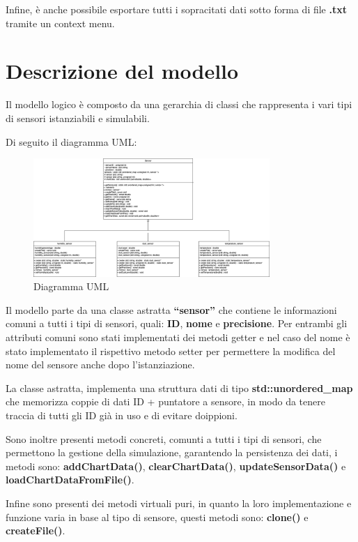 \documentclass{article}
\begin{document}
    Infine, è anche possibile esportare tutti i sopracitati dati sotto forma di file \textbf{.txt} tramite un context menu.

    \section{Descrizione del modello}
    Il modello logico è composto da una gerarchia di classi che rappresenta i vari tipi di sensori istanziabili e simulabili. 
        
    Di seguito il diagramma UML:    
    \begin{figure}[h!]
        \centering
        \includegraphics[width=0.8\textwidth]{UML.png}
        \caption*{Diagramma UML}
    \end{figure}

    \newpage
    \noindent Il modello parte da una classe astratta \textbf{“sensor”} che contiene le informazioni comuni a tutti i tipi di sensori, quali: \textbf{ID}, \textbf{nome} e \textbf{precisione}.
    Per entrambi gli attributi comuni sono stati implementati dei metodi getter e nel caso del nome è stato implementato il rispettivo metodo setter per permettere la modifica del nome del sensore anche dopo l’istanziazione. 

    \noindent La classe astratta, implementa una struttura dati di tipo \textbf{std::unordered\_map} che memorizza coppie di dati ID + puntatore a sensore, in modo da tenere traccia di tutti gli ID già in uso e di evitare doippioni.

    \noindent Sono inoltre presenti metodi concreti, comunti a tutti i tipi di sensori, che permettono la gestione della simulazione, garantendo la persistenza dei dati, i metodi sono:
    \textbf{addChartData()}, \textbf{clearChartData()}, \textbf{updateSensorData()} e \textbf{loadChartDataFromFile()}.

    \noindent Infine sono presenti dei metodi virtuali puri, in quanto la loro implementazione e funzione varia in base al tipo di sensore, questi metodi sono: \textbf{clone()} e \textbf{createFile()}.
\end{document}
